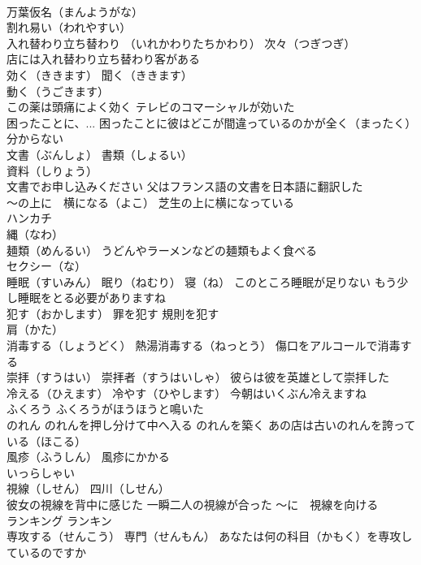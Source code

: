 \documentclass[8pt]{extreport}
\begin{document}
\begin{CJK}{UTF8}{min}
\\	万葉仮名（まんようがな）
\\	割れ易い（われやすい）
\\	入れ替わり立ち替わり （いれかわりたちかわり） 次々（つぎつぎ）
\\	店には入れ替わり立ち替わり客がある
\\	効く（ききます） 聞く（ききます） 
\\	動く（うごきます） 
\\	この薬は頭痛によく効く テレビのコマーシャルが効いた
\\	困ったことに、... 困ったことに彼はどこが間違っているのかが全く（まったく）分からない
\\	文書（ぶんしょ） 書類（しょるい）
\\	資料（しりょう） 
\\	文書でお申し込みください 父はフランス語の文書を日本語に翻訳した
\\	～の上に　横になる（よこ） 芝生の上に横になっている
\\	ハンカチ
\\	縄（なわ）
\\	麺類（めんるい） うどんやラーメンなどの麺類もよく食べる
\\	セクシー（な）
\\	睡眠（すいみん） 眠り（ねむり） 寝（ね） このところ睡眠が足りない もう少し睡眠をとる必要がありますね
\\	犯す（おかします） 罪を犯す 規則を犯す
\\	肩（かた）
\\	消毒する（しょうどく） 熱湯消毒する（ねっとう） 傷口をアルコールで消毒する
\\	崇拝（すうはい） 崇拝者（すうはいしゃ） 彼らは彼を英雄として崇拝した
\\	冷える（ひえます） 冷やす（ひやします） 今朝はいくぶん冷えますね
\\	ふくろう ふくろうがほうほうと鳴いた
\\	のれん のれんを押し分けて中へ入る のれんを築く あの店は古いのれんを誇っている（ほこる）
\\	風疹（ふうしん） 風疹にかかる
\\	いっらしゃい
\\	視線（しせん） 四川（しせん）
\\	彼女の視線を背中に感じた 一瞬二人の視線が合った ～に　視線を向ける
\\	ランキング ランキン
\\	専攻する（せんこう） 専門（せんもん） あなたは何の科目（かもく）を専攻しているのですか

\end{CJK}
\end{document}

